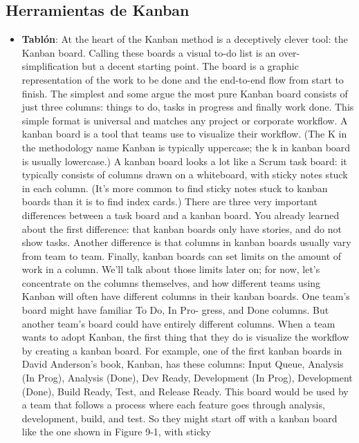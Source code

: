 \subsection{Herramientas de Kanban}
\begin{itemize}
    \item \textbf{Tablón}:
    At the heart of the Kanban method is a deceptively clever tool:
    the Kanban board. Calling these boards a visual to-do list is an
    over-simplification but a decent starting point. The board is a
    graphic representation of the work to be done and the end-to-end
    flow from start to finish. The simplest and some argue the most
    pure Kanban board consists of just three columns: things to do,
    tasks in progress and finally work done. This simple format is
    universal and matches any project or corporate workflow.
    A kanban board is a tool that teams use to visualize their workflow. (The K in the
    methodology name Kanban is typically uppercase; the k in kanban board is usually
    lowercase.) A kanban board looks a lot like a Scrum task board: it typically consists of
    columns drawn on a whiteboard, with sticky notes stuck in each column. (It's more
    common to find sticky notes stuck to kanban boards than it is to find index cards.)
    There are three very important differences between a task board and a kanban board.
    You already learned about the first difference: that kanban boards only have stories,
    and do not show tasks. Another difference is that columns in kanban boards usually
    vary from team to team. Finally, kanban boards can set limits on the amount of work
    in a column. We'll talk about those limits later on; for now, let's concentrate on the
    columns themselves, and how different teams using Kanban will often have different
    columns in their kanban boards. One team's board might have familiar To Do, In Pro-
    gress, and Done columns. But another team's board could have entirely different
    columns.
    When a team wants to adopt Kanban, the first thing that they do is visualize the
    workflow by creating a kanban board. For example, one of the first kanban boards in
    David Anderson's book, Kanban, has these columns: Input Queue, Analysis (In Prog),
    Analysis (Done), Dev Ready, Development (In Prog), Development (Done), Build
    Ready, Test, and Release Ready. This board would be used by a team that follows a
    process where each feature goes through analysis, development, build, and test. So
    they might start off with a kanban board like the one shown in Figure 9-1, with sticky

\end{itemize}
